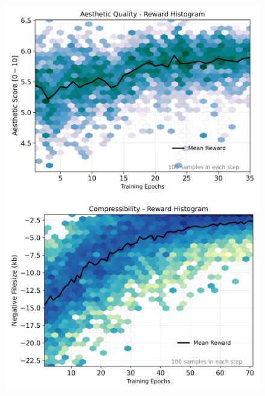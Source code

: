 \begin{figure}[ht]
  \centering
  \begin{minipage}{0.5\textwidth}
      \centering
      \includegraphics[width=1\textwidth]{img/results/reward_hist-laion-aesthetic.png} %
  \end{minipage}\hfill
  \begin{minipage}{0.5\textwidth}
      \centering
  \end{minipage}\vspace{-0.1cm} %
  \begin{minipage}{0.5\textwidth}
      \centering
      \includegraphics[width=1\textwidth]{img/results/reward_hist-jpeg-compressibility.png} %

\end{minipage}
\end{figure}
